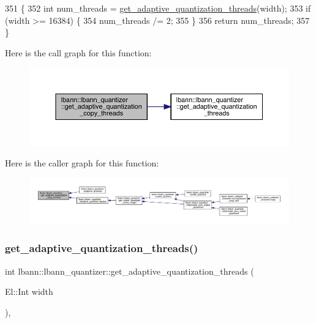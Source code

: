 \begin{DoxyCode}
351                                                                  \{
352     \textcolor{keywordtype}{int} num\_threads = \hyperlink{classlbann_1_1lbann__quantizer_aaa0c20f755437130172c40ca8e95bc3f}{get\_adaptive\_quantization\_threads}(width);
353     \textcolor{keywordflow}{if} (width >= 16384) \{
354       num\_threads /= 2;
355     \}
356     \textcolor{keywordflow}{return} num\_threads;
357   \}
\end{DoxyCode}
Here is the call graph for this function\+:\nopagebreak
\begin{figure}[H]
\begin{center}
\leavevmode
\includegraphics[width=350pt]{classlbann_1_1lbann__quantizer_a22b898932caed41ccf24abcb67c00ba1_cgraph}
\end{center}
\end{figure}
Here is the caller graph for this function\+:\nopagebreak
\begin{figure}[H]
\begin{center}
\leavevmode
\includegraphics[width=350pt]{classlbann_1_1lbann__quantizer_a22b898932caed41ccf24abcb67c00ba1_icgraph}
\end{center}
\end{figure}
\mbox{\label{classlbann_1_1lbann__quantizer_aaa0c20f755437130172c40ca8e95bc3f}} 
\subsubsection{\texorpdfstring{get\+\_\+adaptive\+\_\+quantization\+\_\+threads()}{get\_adaptive\_quantization\_threads()}}
{\footnotesize\ttfamily int lbann\+::lbann\+\_\+quantizer\+::get\+\_\+adaptive\+\_\+quantization\+\_\+threads (\begin{DoxyParamCaption}\item[{El\+::\+Int}]{width }\end{DoxyParamCaption})\hspace{0.3cm}{\ttfamily [inline]}, {\ttfamily [private]}}

